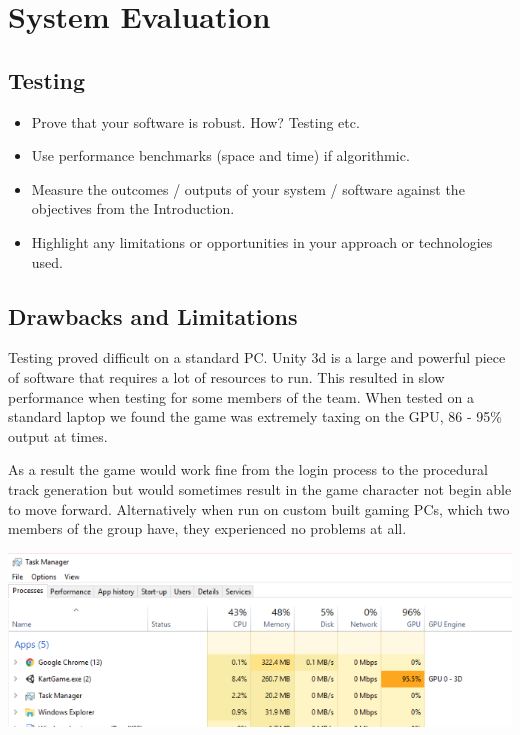 
\chapter{System Evaluation}
\section{Testing}

\begin{itemize}
\item Prove that your software is robust. How? Testing etc. 
\item Use performance benchmarks (space and time) if algorithmic.
\item Measure the outcomes / outputs of your system / software against the objectives from the Introduction.
\item Highlight any limitations or opportunities in your approach or technologies used.
\end{itemize}


\section{Drawbacks and Limitations}
Testing proved difficult on a standard PC. Unity 3d is a large and powerful piece of software that requires a lot of resources to run. This resulted in slow performance when testing for some members of the team. When tested on a standard laptop we found the game was extremely taxing on the GPU, 86 - 95\% output at times.
\newline

As a result the game would work fine from the login process to the procedural track generation but would sometimes result in the game character not begin able to move forward. Alternatively when run on custom built gaming PCs, which two members of the group have, they experienced no problems at all.
\newline

\includegraphics[width=1\columnwidth]{img/output.PNG}
\newline
 
